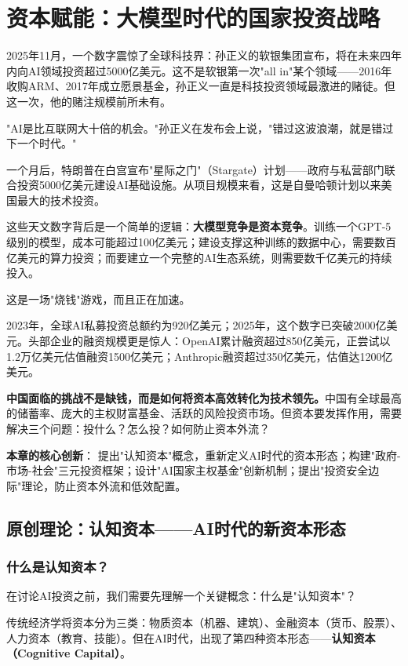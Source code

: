 \chapter{资本赋能：大模型时代的国家投资战略}

2025年11月，一个数字震惊了全球科技界：孙正义的软银集团宣布，将在未来四年内向AI领域投资超过5000亿美元。这不是软银第一次"all in"某个领域——2016年收购ARM、2017年成立愿景基金，孙正义一直是科技投资领域最激进的赌徒。但这一次，他的赌注规模前所未有。

"AI是比互联网大十倍的机会。"孙正义在发布会上说，"错过这波浪潮，就是错过下一个时代。"

一个月后，特朗普在白宫宣布"星际之门"（Stargate）计划——政府与私营部门联合投资5000亿美元建设AI基础设施。从项目规模来看，这是自曼哈顿计划以来美国最大的技术投资。

这些天文数字背后是一个简单的逻辑：\textbf{大模型竞争是资本竞争}。训练一个GPT-5级别的模型，成本可能超过100亿美元；建设支撑这种训练的数据中心，需要数百亿美元的算力投资；而要建立一个完整的AI生态系统，则需要数千亿美元的持续投入。

这是一场"烧钱"游戏，而且正在加速。

2023年，全球AI私募投资总额约为920亿美元；2025年，这个数字已突破2000亿美元。头部企业的融资规模更是惊人：OpenAI累计融资超过850亿美元，正尝试以1.2万亿美元估值融资1500亿美元；Anthropic融资超过350亿美元，估值达1200亿美元。

\textbf{中国面临的挑战不是缺钱，而是如何将资本高效转化为技术领先。}中国有全球最高的储蓄率、庞大的主权财富基金、活跃的风险投资市场。但资本要发挥作用，需要解决三个问题：投什么？怎么投？如何防止资本外流？

\textbf{本章的核心创新}：
提出"认知资本"概念，重新定义AI时代的资本形态；构建"政府-市场-社会"三元投资框架；设计"AI国家主权基金"创新机制；提出"投资安全边际"理论，防止资本外流和低效配置。

\section{原创理论：认知资本——AI时代的新资本形态}

\subsection{什么是认知资本？}

在讨论AI投资之前，我们需要先理解一个关键概念：什么是"认知资本"？

传统经济学将资本分为三类：物质资本（机器、建筑）、金融资本（货币、股票）、人力资本（教育、技能）。但在AI时代，出现了第四种资本形态——\textbf{认知资本（Cognitive Capital）}。


